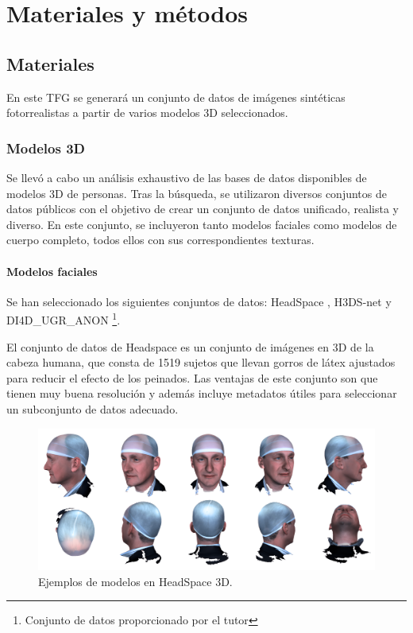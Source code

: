 \chapter{Materiales y métodos}
\thispagestyle{empty}

\section{Materiales}

En este TFG se generará un conjunto de datos de imágenes sintéticas fotorrealistas a partir de varios modelos 3D seleccionados.

\subsection{Modelos 3D}

Se llevó a cabo un análisis exhaustivo de las bases de datos disponibles de modelos 3D de personas. Tras la búsqueda, se utilizaron diversos conjuntos de datos públicos con el objetivo de crear un conjunto de datos unificado, realista y diverso. En este conjunto, se incluyeron tanto modelos faciales como modelos de cuerpo completo, todos ellos con sus correspondientes texturas.

\subsubsection{Modelos faciales}
Se han seleccionado los siguientes conjuntos de datos: HeadSpace \cite{60}, H3DS-net \cite{61} y DI4D\_UGR\_ANON \footnote{Conjunto de datos proporcionado por el tutor}.

El conjunto de datos de Headspace \cite{60} es un conjunto de imágenes en 3D de la cabeza humana, que consta de 1519 sujetos que llevan gorros de látex ajustados para reducir el efecto de los peinados. Las ventajas de este conjunto son que tienen muy buena resolución y además incluye metadatos útiles para seleccionar un subconjunto de datos adecuado.

\begin{figure}[h]
	\centering
	\includegraphics[scale=0.075]{imagenes/cap4/headspace.png}
	\caption[Ejemplos HeadSpace 3D.]{Ejemplos de modelos en HeadSpace 3D.}
	\label{fig17}
\end{figure}


